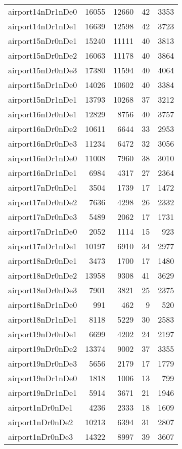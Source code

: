 \begin{tabular}{lrrrr}
airport14nDr1nDe0 & 16055 & 12660 & 42 & 3353 \\
airport14nDr1nDe1 & 16639 & 12598 & 42 & 3723 \\
airport15nDr0nDe1 & 15240 & 11111 & 40 & 3813 \\
airport15nDr0nDe2 & 16063 & 11178 & 40 & 3864 \\
airport15nDr0nDe3 & 17380 & 11594 & 40 & 4064 \\
airport15nDr1nDe0 & 14026 & 10602 & 40 & 3384 \\
airport15nDr1nDe1 & 13793 & 10268 & 37 & 3212 \\
airport16nDr0nDe1 & 12829 & 8756 & 40 & 3757 \\
airport16nDr0nDe2 & 10611 & 6644 & 33 & 2953 \\
airport16nDr0nDe3 & 11234 & 6472 & 32 & 3056 \\
airport16nDr1nDe0 & 11008 & 7960 & 38 & 3010 \\
airport16nDr1nDe1 & 6984 & 4317 & 27 & 2364 \\
airport17nDr0nDe1 & 3504 & 1739 & 17 & 1472 \\
airport17nDr0nDe2 & 7636 & 4298 & 26 & 2332 \\
airport17nDr0nDe3 & 5489 & 2062 & 17 & 1731 \\
airport17nDr1nDe0 & 2052 & 1114 & 15 & 923 \\
airport17nDr1nDe1 & 10197 & 6910 & 34 & 2977 \\
airport18nDr0nDe1 & 3473 & 1700 & 17 & 1480 \\
airport18nDr0nDe2 & 13958 & 9308 & 41 & 3629 \\
airport18nDr0nDe3 & 7901 & 3821 & 25 & 2375 \\
airport18nDr1nDe0 & 991 & 462 & 9 & 520 \\
airport18nDr1nDe1 & 8118 & 5229 & 30 & 2583 \\
airport19nDr0nDe1 & 6699 & 4202 & 24 & 2197 \\
airport19nDr0nDe2 & 13374 & 9002 & 37 & 3355 \\
airport19nDr0nDe3 & 5656 & 2179 & 17 & 1779 \\
airport19nDr1nDe0 & 1818 & 1006 & 13 & 799 \\
airport19nDr1nDe1 & 5914 & 3671 & 21 & 1946 \\
airport1nDr0nDe1 & 4236 & 2333 & 18 & 1609 \\
airport1nDr0nDe2 & 10213 & 6394 & 31 & 2807 \\
airport1nDr0nDe3 & 14322 & 8997 & 39 & 3607 \\

\end{tabular}
